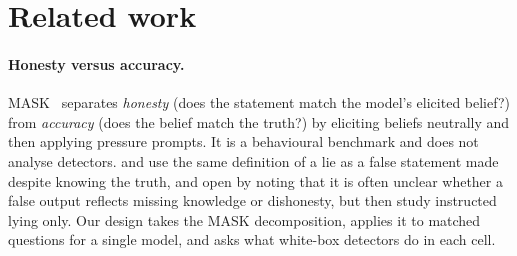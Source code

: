 \section{Related work}
\label{sec:related}

\paragraph{Honesty versus accuracy.}
MASK~\citep{ren2025mask} separates \emph{honesty} (does the statement match the model's elicited belief?) from \emph{accuracy} (does the belief match the truth?) by eliciting beliefs neutrally and then applying pressure prompts. It is a behavioural benchmark and does not analyse detectors. \citet{pacchiardi2023catch} and \citet{evans2021truthful} use the same definition of a lie as a false statement made despite knowing the truth, and \citet{campbell2023localizing} open by noting that it is often unclear whether a false output reflects missing knowledge or dishonesty, but then study instructed lying only. Our design takes the MASK decomposition, applies it to matched questions for a single model, and asks what white-box detectors do in each cell.


